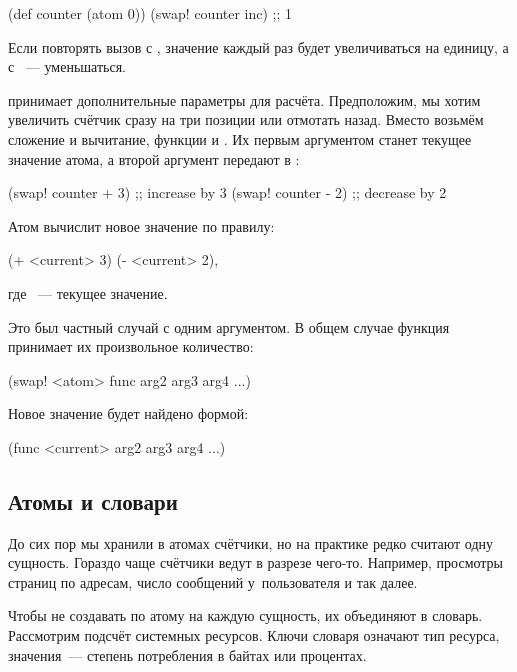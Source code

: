 
\begin{clojure}
(def counter (atom 0))
(swap! counter inc) ;; 1
\end{clojure}

\noindent
Если повторять вызов  с , значение  каждый
раз будет увеличиваться на единицу, а с ~--- уменьшаться.

 принимает дополнительные параметры для расчёта. Предположим, мы
хотим увеличить счётчик сразу на три позиции или отмотать назад. Вместо
 возьмём сложение и вычитание, функции \code{+} и \code{-}. Их
первым аргументом станет текущее значение атома, а второй аргумент передают в
:

\begin{clojure}
(swap! counter + 3) ;; increase by 3
(swap! counter - 2) ;; decrease by 2
\end{clojure}

Атом вычислит новое значение по правилу:

\begin{clojure}
(+ <current> 3)
(- <current> 2),
\end{clojure}

\noindent
где ~--- текущее значение.

Это был частный случай  с одним аргументом. В общем случае функция
принимает их произвольное количество:

\begin{clojure}
(swap! <atom> func arg2 arg3 arg4 ...)
\end{clojure}

\noindent
Новое значение будет найдено формой:

\begin{clojure}
(func <current> arg2 arg3 arg4 ...)
\end{clojure}

\subsection{Атомы и словари}

До сих пор мы хранили в атомах счётчики, но на практике редко считают одну
сущность. Гораздо чаще счётчики ведут в разрезе чего-то. Например, просмотры
страниц по адресам, число сообщений у~пользователя и так далее.

Чтобы не создавать по атому на каждую сущность, их объединяют в
словарь. Рассмотрим подсчёт системных ресурсов. Ключи словаря означают тип
ресурса, значения~--- степень потребления в байтах или процентах.

